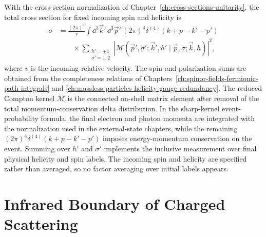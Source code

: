 With the cross-section normalization of
Chapter~\ref{ch:cross-sections-unitarity}, the total cross section
for fixed incoming spin and helicity is
\[
\begin{aligned}
  \sigma
  &=
  \frac{(2\pi)^6}{v}
  \int\dd^3\vec k'\,\dd^3\vec p'\,
  (2\pi)^4\delta^{(4)}(k+p-k'-p')  \\
  &\qquad\times
  \sum_{\substack{h'=\pm1\\ \sigma'=1,2}}
  \left|
    \mathcal M(\vec p',\sigma';\vec k',h'
    \mid
    \vec p,\sigma;\vec k,h)
  \right|^2 ,
\end{aligned}
\]
where \(v\) is the incoming relative velocity. The spin and polarization sums
are obtained from the completeness relations of
Chapters~\ref{ch:spinor-fields-fermionic-path-integrals} and
\ref{ch:massless-particles-helicity-gauge-redundancy}.
The reduced Compton kernel \(\mathcal M\) is the connected on-shell
matrix element after removal of the total momentum-conservation delta
distribution.  In the sharp-kernel event-probability formula, the final
electron and photon momenta are integrated with the normalization used in the
external-state chapters, while the remaining
\((2\pi)^4\delta^{(4)}(k+p-k'-p')\) imposes energy-momentum conservation on
the event.  Summing over \(h'\) and \(\sigma'\) implements the inclusive
measurement over final physical helicity and spin labels.  The incoming spin
and helicity are specified rather than averaged, so no factor averaging over
initial labels appears.

\section{Infrared Boundary of Charged Scattering}


